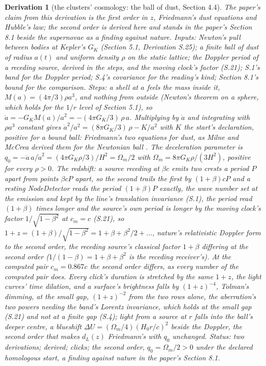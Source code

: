 \documentclass[pdflatex,sn-mathphys-num]{sn-jnl}
\theoremstyle{thmstyleone}
\newtheorem{derivation}{Derivation}
\begin{document}
\begin{derivation}[the clusters' cosmology: the ball of dust, Section 4.4]
The paper's claim from this derivation is the first order in $z$, Friedmann's dust equations and Hubble's law; the second order is derived here and stands in the paper's Section 8.1 beside the supernovae as a finding against nature. \emph{Inputs:} Newton's pull between bodies at Kepler's $G_K$ (Section 5.1, Derivation S.25); a finite ball of dust of radius $a(t)$ and uniform density $\rho$ on the static lattice; the Doppler period of a receding source, derived in the steps, and the moving clock's factor (S.21); S.1's band for the Doppler period; S.4's covariance for the reading's kind; Section 8.1's bound for the comparison. \emph{Steps:} a shell at $a$ feels the mass inside it, $M(a) = (4\pi / 3)\rho a^3$, and nothing from outside (Newton's theorem on a sphere, which holds for the $1 / r$ level of Section 5.1), so $\ddot a = -G_K M(a) / a^2 = -(4\pi G_K / 3)\,\rho\,a$. Multiplying by $\dot a$ and integrating with $\rho a^3$ constant gives $\dot a^2 / a^2 = (8\pi G_K / 3)\,\rho - K / a^2$ with $K$ the start's declaration, positive for a bound ball: Friedmann's two equations for dust, as Milne and McCrea derived them for the Newtonian ball \cite{mccrea}. The deceleration parameter is $q_0 = -\ddot a\,a / \dot a^2 = (4\pi G_K \rho / 3) / H^2 = \Omega_m / 2$ with $\Omega_m = 8\pi G_K\rho / (3H^2)$, positive for every $\rho > 0$. \emph{The redshift:} a source receding at $\beta c$ emits two crests a period $P$ apart from points $\beta c P$ apart, so the second trails the first by $(1 + \beta) c P$ and a resting NodeDetector reads the period $(1 + \beta) P$ exactly, the wave number set at the emission and kept by the line's translation invariance (S.1), the period read $(1 + \beta)$ times longer and the source's own period is longer by the moving clock's factor $1 / \sqrt{1 - \beta^2}$ at $c_m = c$ (S.21), so $1 + z = (1 + \beta) / \sqrt{1 - \beta^2} = 1 + \beta + \beta^2 / 2 + \dots$, nature's relativistic Doppler form to the second order, the receding source's classical factor $1 + \beta$ differing at the second order ($1 / (1 - \beta) = 1 + \beta + \beta^2$ is the receding receiver's). At the computed pair $c_m = 0.867c$ the second order differs, as every number of the computed pair does. Every click's duration is stretched by the same $1 + z$, the light curves' time dilation, and a surface's brightness falls by $(1 + z)^{-4}$, Tolman's dimming, at the small gap, $(1 + z)^{-2}$ from the two rows alone, the aberration's two powers needing the band's Lorentz invariance, which holds at the small gap (S.21) and not at a finite gap (S.4); light from a source at $r$ falls into the ball's deeper centre, a blueshift $\Delta U = (\Omega_m / 4)(H_0 r / c)^2$ beside the Doppler, the second order that makes $d_L(z)$ Friedmann's with $q_0$ unchanged. \emph{Status:} two derivations; derived; clicks; the second order, $q_0 = \Omega_m / 2 > 0$ under the declared homologous start, a finding against nature in the paper's Section 8.1.
\end{derivation}
\end{document}
